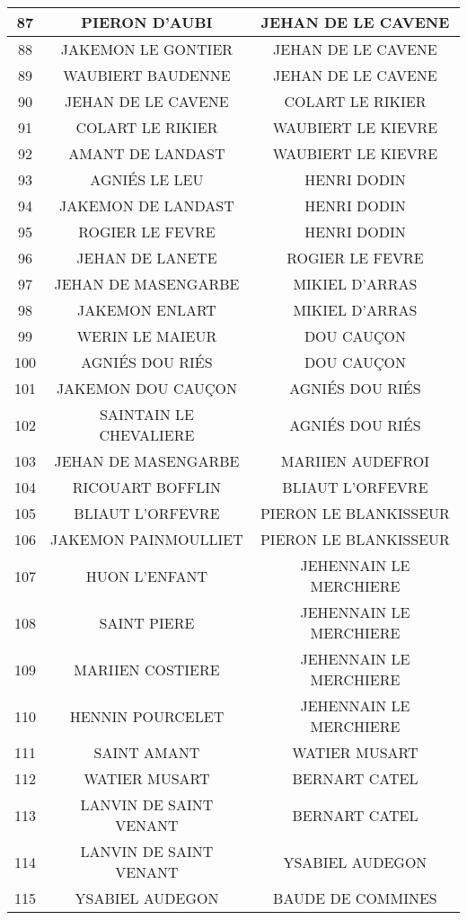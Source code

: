 \begin{center}
\begin{longtable}{|c|c|c|}
\hline	87	&	PIERON D'AUBI	&	JEHAN DE LE CAVENE	\\
\hline	88	&	JAKEMON LE GONTIER	&	JEHAN DE LE CAVENE	\\
\hline	89	&	WAUBIERT BAUDENNE	&	JEHAN DE LE CAVENE	\\
\hline	90	&	JEHAN DE LE CAVENE	&	COLART LE RIKIER	\\
\hline	91	&	COLART LE RIKIER	&	WAUBIERT LE KIEVRE	\\
\hline	92	&	AMANT DE LANDAST	&	WAUBIERT LE KIEVRE	\\
\hline	93	&	AGNIÉS LE LEU	&	HENRI DODIN	\\
\hline	94	&	JAKEMON DE LANDAST	&	HENRI DODIN	\\
\hline	95	&	ROGIER LE FEVRE	&	HENRI DODIN	\\
\hline	96	&	JEHAN DE LANETE	&	ROGIER LE FEVRE	\\
\hline	97	&	JEHAN DE MASENGARBE	&	MIKIEL D'ARRAS	\\
\hline	98	&	JAKEMON ENLART	&	MIKIEL D'ARRAS	\\
\hline	99	&	WERIN LE MAIEUR	&	DOU CAUÇON	\\
\hline	100	&	AGNIÉS DOU RIÉS	&	DOU CAUÇON	\\
\hline	101	&	JAKEMON DOU CAUÇON	&	AGNIÉS DOU RIÉS	\\
\hline	102	&	SAINTAIN LE CHEVALIERE	&	AGNIÉS DOU RIÉS	\\
\hline	103	&	JEHAN DE MASENGARBE	&	MARIIEN AUDEFROI	\\
\hline	104	&	RICOUART BOFFLIN	&	BLIAUT L'ORFEVRE	\\
\hline	105	&	BLIAUT L'ORFEVRE	&	PIERON LE BLANKISSEUR	\\
\hline	106	&	JAKEMON PAINMOULLIET	&	PIERON LE BLANKISSEUR	\\
\hline	107	&	HUON L'ENFANT	&	JEHENNAIN LE MERCHIERE	\\
\hline	108	&	SAINT PIERE	&	JEHENNAIN LE MERCHIERE	\\
\hline	109	&	MARIIEN COSTIERE	&	JEHENNAIN LE MERCHIERE	\\
\hline	110	&	HENNIN POURCELET	&	JEHENNAIN LE MERCHIERE	\\
\hline	111	&	SAINT AMANT	&	WATIER MUSART	\\
\hline	112	&	WATIER MUSART	&	BERNART CATEL	\\
\hline	113	&	LANVIN DE SAINT VENANT	&	BERNART CATEL	\\
\hline	114	&	LANVIN DE SAINT VENANT	&	YSABIEL AUDEGON	\\
\hline	115	&	YSABIEL AUDEGON	&	BAUDE DE COMMINES	\\

\end{longtable}
\end{center}
